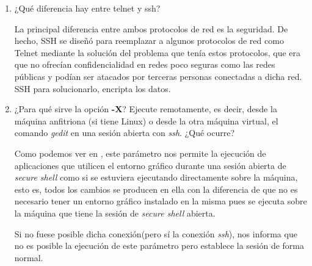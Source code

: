 \documentclass[paper=a4, fontsize=11pt]{scrartcl} %
\numberwithin{equation}{section} %
\numberwithin{figure}{section} %
\numberwithin{table}{section} %
\begin{document}
\begin{enumerate}
		De hecho, ambos servicios están colgados de forma abierta y permitiendo no sólo ver el código
		que utilizan si no también proponer cómo corregir un bug encontrado, reportarlo o simplemente
		crear nuestro propio gestor de paquetes basado en alguno de ellos\cite{oS_YaST_GitHub}
		\cite{oS_zypper_GitHub}.
		
		Ambos se distribuyen bajo la licencia \href{https://www.gnu.org/licenses/gpl.html}{\textbf{GPL}}
		\footnote{De hecho, creo que incluso utilizan la misma versión de dicha licencia.}.
	
	\section{Gestión de los cortafuegos(\textit{Firewalls})}
	\section{Instalación del servicio de acceso remoto a la consola(\textit{Secure Shell})}
		\item ¿Qué diferencia hay entre telnet y ssh?
		
		La principal diferencia entre ambos protocolos de red es la seguridad\cite{Telnet}\cite{SSH}.
		De hecho, SSH se diseñó para reemplazar a algunos protocolos de red como Telnet mediante
		la solución del problema que tenía estos protocolos, que era que no ofrecían confidencialidad
		en redes poco seguras como las redes públicas y podían ser atacados por terceras personas
		conectadas a dicha red. SSH para solucionarlo, encripta los datos.
		
		
		\item ¿Para qué sirve la opción \textbf{-X}? Ejecute remotamente, es decir, desde la máquina
		anfitriona (si tiene Linux) o desde la otra máquina virtual, el comando \textit{gedit} en una
		sesión abierta con \textit{ssh}. ¿Qué ocurre?
		
		Como podemos ver en \cite{man_SSH}, este parámetro nos permite la ejecución de aplicaciones
		que utilicen el entorno gráfico durante una sesión abierta de \textit{secure shell} como si
		se estuviera ejecutando directamente sobre la máquina, esto es, todos los cambios se producen
		en ella con la diferencia de que no es necesario tener un entorno gráfico instalado en la
		misma pues se ejecuta sobre la máquina que tiene la sesión de \textit{secure shell} abierta.
		
		Si no fuese posible dicha conexión(pero sí la conexión \textit{ssh}), nos informa que no es
		posible la ejecución de este parámetro pero establece la sesión de forma normal.
		

\end{enumerate}
\end{document}

